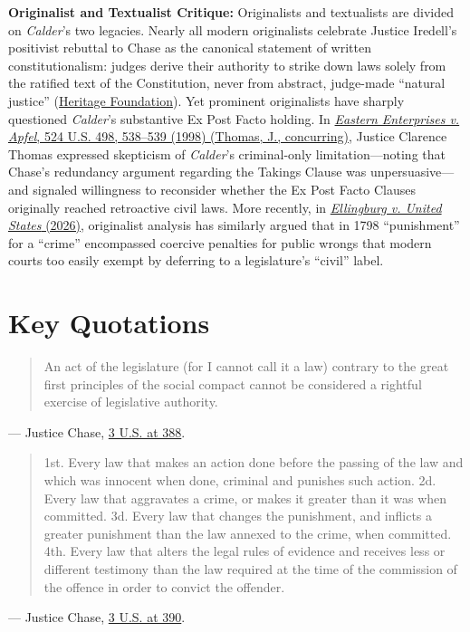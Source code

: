 \documentclass[12pt]{article}
\begin{document}
\textbf{Originalist and Textualist Critique:} Originalists and textualists are divided on \textit{Calder}'s two legacies. Nearly all modern originalists celebrate Justice Iredell's positivist rebuttal to Chase as the canonical statement of written constitutionalism: judges derive their authority to strike down laws solely from the ratified text of the Constitution, never from abstract, judge-made ``natural justice'' (\href{https://www.heritage.org/courts/report/judicial-supremacy-and-our-two-constitutions-reflections-the-historical-record}{Heritage Foundation}). Yet prominent originalists have sharply questioned \textit{Calder}'s substantive Ex Post Facto holding. In \href{https://www.law.cornell.edu/supct/html/97-42.ZC.html}{\textit{Eastern Enterprises v. Apfel}, 524 U.S. 498, 538--539 (1998) (Thomas, J., concurring)}, Justice Clarence Thomas expressed skepticism of \textit{Calder}'s criminal-only limitation---noting that Chase's redundancy argument regarding the Takings Clause was unpersuasive---and signaled willingness to reconsider whether the Ex Post Facto Clauses originally reached retroactive civil laws. More recently, in \href{https://www.supremecourt.gov/opinions/25pdf/24-482_d1oe.pdf}{\textit{Ellingburg v. United States} (2026)}, originalist analysis has similarly argued that in 1798 ``punishment'' for a ``crime'' encompassed coercive penalties for public wrongs that modern courts too easily exempt by deferring to a legislature's ``civil'' label.

\section{Key Quotations}

\begin{quote}
An act of the legislature (for I cannot call it a law) contrary to the great first principles of the social compact cannot be considered a rightful exercise of legislative authority.
\end{quote}
\noindent --- Justice Chase, \href{https://supreme.justia.com/cases/federal/us/3/386/}{3 U.S. at 388}.

\begin{quote}
1st. Every law that makes an action done before the passing of the law and which was innocent when done, criminal and punishes such action. 2d. Every law that aggravates a crime, or makes it greater than it was when committed. 3d. Every law that changes the punishment, and inflicts a greater punishment than the law annexed to the crime, when committed. 4th. Every law that alters the legal rules of evidence and receives less or different testimony than the law required at the time of the commission of the offence in order to convict the offender.
\end{quote}
\noindent --- Justice Chase, \href{https://supreme.justia.com/cases/federal/us/3/386/}{3 U.S. at 390}.
\end{document}
